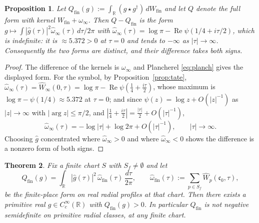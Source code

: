 \documentclass[11pt]{amsart}
\newtheorem{theorem}{Theorem}[section]
\newtheorem{proposition}[theorem]{Proposition}
\theoremstyle{definition}
\theoremstyle{remark}
\newcommand{\R}{\mathbb R}
\newcommand{\Rel}{\operatorname{Re}}
\newcommand{\Wfin}{W_{\mathrm{fin}}}
\begin{document}
\begin{proposition}\label{prop:formsdiffer}
Let $Q_{\mathrm{fin}}(g):=\int_\R(g\star g^\dagger)\,d\Wfin$ and let $Q$ denote
the full form with kernel $\Wfin+\omega_\infty$. Then $Q-Q_{\mathrm{fin}}$ is
the form $g\mapsto\int|\widehat g(\tau)|^2\widehat\omega_\infty(\tau)\,
d\tau/2\pi$ with
$\widehat\omega_\infty(\tau)=\log\pi-\Rel\psi(1/4+i\tau/2)$, which is
\emph{indefinite}: it is $\approx5.372>0$ at $\tau=0$ and tends to $-\infty$
as $|\tau|\to\infty$. Consequently the two forms are distinct, and their
difference takes both signs.
\end{proposition}

\begin{proof}
The difference of the kernels is $\omega_\infty$ and Plancherel
\eqref{eq:planch} gives the displayed form. For the symbol, by
Proposition~\ref{prop:tate},
$\widehat\omega_\infty(\tau)=\widehat W_\infty(0,\tau)
=\log\pi-\Rel\psi(\tfrac14+\tfrac{i\tau}2)$, whose maximum is
$\log\pi-\psi(1/4)\approx5.372$ at $\tau=0$; and since
$\psi(z)=\log z+O(|z|^{-1})$ as $|z|\to\infty$ with $|\arg z|\le\pi/2$, and
$|\tfrac14+\tfrac{i\tau}2|=\tfrac{|\tau|}2+O(|\tau|^{-1})$,
\begin{equation}\label{eq:symbolasym}
  \widehat\omega_\infty(\tau)=-\log|\tau|+\log2\pi+O(|\tau|^{-1}),
  \qquad|\tau|\to\infty .
\end{equation}
Choosing $\widehat g$ concentrated where $\widehat\omega_\infty>0$ and where
$\widehat\omega_\infty<0$ shows the difference is a nonzero form of both signs.
\end{proof}

\begin{theorem}\label{thm:qfinpositive}
Fix a finite chart $S$ with $S_f\ne\emptyset$ and let
\begin{equation}\label{eq:qfin}
  Q_{\mathrm{fin}}(g)=\int_\R|\widehat g(\tau)|^2\,
    \widehat\omega_{\mathrm{fin}}(\tau)\,\frac{d\tau}{2\pi},\qquad
  \widehat\omega_{\mathrm{fin}}(\tau):=\sum_{p\in S_f}
    \widehat W_p(\mathfrak c_0,\tau),
\end{equation}
be the finite-place form on real radial profiles at that chart.  Then there
exists a \emph{primitive} real $g\in C_c^\infty(\R)$ with
$Q_{\mathrm{fin}}(g)>0$.  In particular $Q_{\mathrm{fin}}$ is not negative
semidefinite on primitive radial classes, at any finite chart.
\end{theorem}
\end{document}
